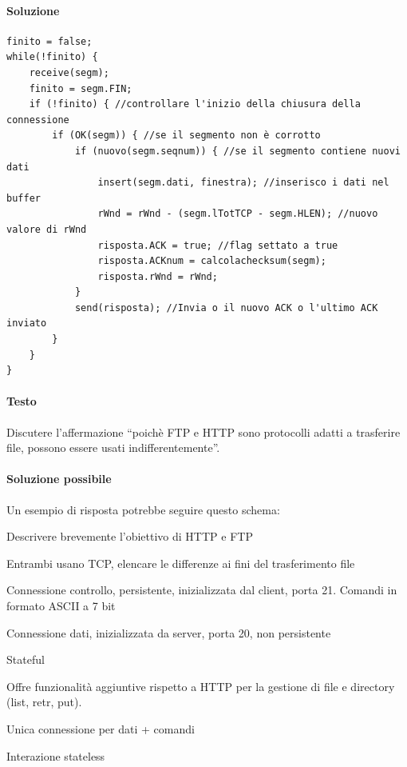 \documentclass[10pt]{article}
\begin{document}
{\paragraph{Soluzione}
\begin{verbatim}
finito = false;
while(!finito) {
    receive(segm);
    finito = segm.FIN;
    if (!finito) { //controllare l'inizio della chiusura della connessione
        if (OK(segm)) { //se il segmento non è corrotto
            if (nuovo(segm.seqnum)) { //se il segmento contiene nuovi dati
                insert(segm.dati, finestra); //inserisco i dati nel buffer
                rWnd = rWnd - (segm.lTotTCP - segm.HLEN); //nuovo valore di rWnd
                risposta.ACK = true; //flag settato a true
                risposta.ACKnum = calcolachecksum(segm);
                risposta.rWnd = rWnd;
            }
            send(risposta); //Invia o il nuovo ACK o l'ultimo ACK inviato
        }
    }
}
\end{verbatim}
\pagebreak
\paragraph{Testo} Discutere l’affermazione “poichè FTP e HTTP sono protocolli adatti a trasferire file, possono essere usati indifferentemente”.
\paragraph{Soluzione possibile} Un esempio di risposta potrebbe seguire questo schema:
\begin{list}{-}{}
\item Descrivere brevemente l'obiettivo di HTTP e FTP
\item Entrambi usano TCP, elencare le differenze ai fini del trasferimento file
\end{list}
\begin{list}{}{FTP}
\item Connessione controllo, persistente, inizializzata dal client, porta 21. Comandi in formato ASCII a 7 bit
\item Connessione dati, inizializzata da server, porta 20, non persistente
\item Stateful
\item Offre funzionalità aggiuntive rispetto a HTTP per la gestione di file e directory (list, retr, put).
\end{list}
\begin{list}{}{HTTP}
\item Unica connessione per dati + comandi
\item Interazione stateless
\end{list}
}
\end{document}
